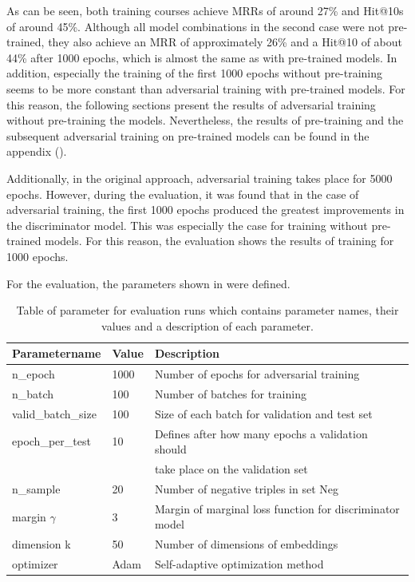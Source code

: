 As can be seen, both training courses achieve MRRs of around 27\% and Hit@10s of around 45\%.
Although all model combinations in the second case were not pre-trained, they also achieve an MRR of approximately 26\% and a Hit@10 of about 44\% after 1000 epochs, which is almost the same as with pre-trained models.
In addition, especially the training of the first 1000 epochs without pre-training seems to be more constant than adversarial training with pre-trained models.
For this reason, the following sections present the results of adversarial training without pre-training the models.
Nevertheless, the results of pre-training and the subsequent adversarial training on pre-trained models can be found in the appendix ().

Additionally, in the original approach, adversarial training takes place for 5000 epochs.
However, during the evaluation, it was found that in the case of adversarial training, the first 1000 epochs produced the greatest improvements in the discriminator model.
This was especially the case for training without pre-trained models.
For this reason, the evaluation shows the results of training for 1000 epochs.

For the evaluation, the parameters shown in  were defined.
\begin{table}[h]
    \centering
    \begin{tabular}{lll}
        \toprule
        
        \textbf{Parametername} & 
        \textbf{Value} & 
        \textbf{Description} \\
    
        \midrule
         n\_epoch & 1000 & Number of epochs for adversarial training\\
         n\_batch & 100 & Number of batches for training \\
         
         valid\_batch\_size & 100 & Size of each batch for validation and test set\\
         epoch\_per\_test & 10 & Defines after how many epochs a validation should \\
         &  & take place on the validation set \\
         n\_sample & 20 & Number of negative triples in set Neg \\

        margin $\gamma$ & 3 & Margin of marginal loss function for discriminator model\\
        dimension k & 50 & Number of dimensions of embeddings \\ 
        optimizer & Adam & Self-adaptive optimization method \\

        \bottomrule
    \end{tabular}
    \caption{Table of parameter for evaluation runs which contains parameter names, their values and a description of each parameter.}
\label{tab:evaluation_parameter}
\end{table}
\clearpage